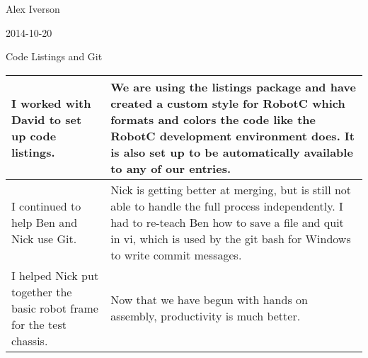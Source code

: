 Alex Iverson

2014-10-20

Code Listings and Git

\begin{tabular}{|p{5cm}|p{5cm}|}
 \hline
 I worked with David to set up code listings.&
 We are using the listings package and have created a custom style for RobotC which formats and colors the code like the RobotC development environment does. It is also set up to be automatically available to any of our entries. \\
 \hline
 I continued to help Ben and Nick use Git.&
 Nick is getting better at merging, but is still not able to handle the full process independently. I had to re-teach Ben how to save a file and quit in vi, which is used by the git bash for Windows to write commit messages.\\
 \hline
 I helped Nick put together the basic robot frame for the test chassis.&
 Now that we have begun with hands on assembly, productivity is much better.\\
 \hline
\end{tabular}
